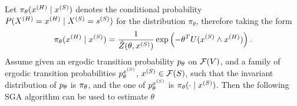 %



Let $\pi_\theta(x^{(H)} \mid x^{(S)})$ denotes the conditional probability $P(X^{(H)} = x^{(H)}\mid X^{(S)} =s^{(S)})$ for the distribution $\pi_\theta$, therefore taking the form
\[
\pi_\theta(x^{(H)}\mid x^{(S)}) = \frac{1}{\tilde Z(\theta, x^{(S)})}\exp\left(-\theta^TU(x^{(S)} \wedge x^{(H)})\right).
\]
Assume given an ergodic
transition probability $p_\theta$ on ${\mathcal F}(V)$, and a family of
ergodic transition probabilities
$p_\theta^{x^{(S)}}$, $x^{(S)}\in {\mathcal F}(S)$, such that the invariant
distribution of $p_\theta$ is $\pi_\theta$, and the one of $p_\theta^{x^{(S)}}$ is
$\pi_\theta(\cdot\mid x^{(S)})$. Then the following SGA algorithm can be used to estimate $\theta$

